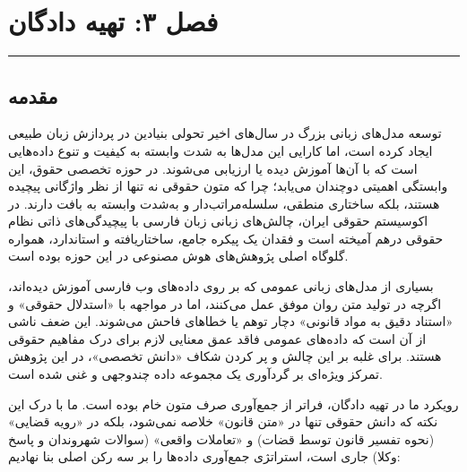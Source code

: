 \documentclass[12pt,a4paper]{report}
\begin{document}
	\sloppy
	
	
	\chapter*{\bfseries فصل ۳: تهیه دادگان}
	
	\vspace{-2.5em}
	\noindent\rule{\textwidth}{0.5pt}
	\vspace{0.5em}
	
	\section{مقدمه}
	
	توسعه مدل‌های زبانی بزرگ  در سال‌های اخیر تحولی بنیادین در پردازش زبان طبیعی ایجاد کرده است، اما کارایی این مدل‌ها به شدت وابسته به کیفیت و تنوع داده‌هایی است که با آن‌ها آموزش دیده یا ارزیابی می‌شوند. در حوزه تخصصی حقوق، این وابستگی اهمیتی دوچندان می‌یابد؛ چرا که متون حقوقی نه تنها از نظر واژگانی پیچیده هستند، بلکه ساختاری منطقی، سلسله‌مراتب‌دار و به‌شدت وابسته به بافت  دارند. در اکوسیستم حقوقی ایران، چالش‌های زبانی زبان فارسی با پیچیدگی‌های ذاتی نظام حقوقی درهم آمیخته است و فقدان یک پیکره  جامع، ساختاریافته و استاندارد، همواره گلوگاه اصلی پژوهش‌های هوش مصنوعی در این حوزه بوده است.
	
	بسیاری از مدل‌های زبانی عمومی که بر روی داده‌های وب فارسی آموزش دیده‌اند، اگرچه در تولید متن روان موفق عمل می‌کنند، اما در مواجهه با «استدلال حقوقی» و «استناد دقیق به مواد قانونی» دچار توهم  یا خطاهای فاحش می‌شوند. این ضعف ناشی از آن است که داده‌های عمومی فاقد عمق معنایی لازم برای درک مفاهیم حقوقی هستند. برای غلبه بر این چالش و پر کردن شکاف «دانش تخصصی»، در این پژوهش تمرکز ویژه‌ای بر گردآوری یک مجموعه داده چندوجهی و غنی شده است.
	
	رویکرد ما در تهیه دادگان، فراتر از جمع‌آوری صرف متون خام بوده است. ما با درک این نکته که دانش حقوقی تنها در «متن قانون» خلاصه نمی‌شود، بلکه در «رویه قضایی» (نحوه تفسیر قانون توسط قضات) و «تعاملات واقعی» (سوالات شهروندان و پاسخ وکلا) جاری است، استراتژی جمع‌آوری داده‌ها را بر سه رکن اصلی بنا نهادیم:
	
\end{document}
